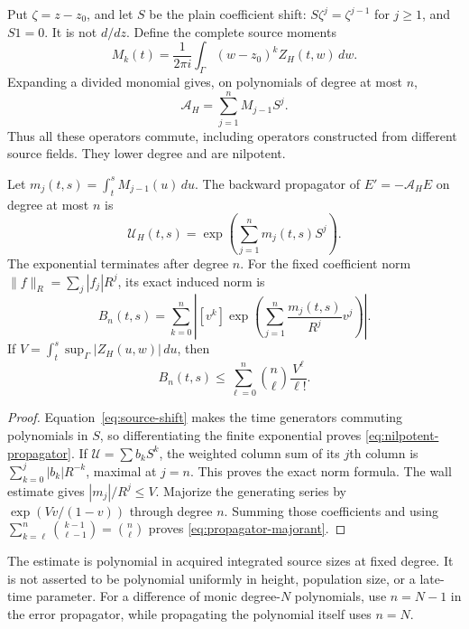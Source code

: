 Put $\zeta=z-z_0$, and let $S$ be the plain coefficient shift:
$S\zeta^j=\zeta^{j-1}$ for $j\ge1$, and $S1=0$. It is not
$d/dz$. Define the complete source moments
\[
 M_k(t)=\frac1{2\pi i}\int_\Gamma(w-z_0)^k Z_H(t,w)\,dw.
\]
Expanding a divided monomial gives, on polynomials of degree at most $n$,
\begin{equation}\label{eq:source-shift}
 \mathcal A_H=\sum_{j=1}^{n}M_{j-1}S^j.
\end{equation}
Thus all these operators commute, including operators constructed from
different source fields. They lower degree and are nilpotent.

\begin{theorem}\label{thm:nilpotent-propagator}
Let $m_j(t,s)=\int_t^sM_{j-1}(u)\,du$. The backward propagator of
$E'=-\mathcal A_HE$ on degree at most $n$ is
\begin{equation}\label{eq:nilpotent-propagator}
 \mathcal U_H(t,s)=\exp\!\left(\sum_{j=1}^n m_j(t,s)S^j\right).
\end{equation}
The exponential terminates after degree $n$. For the fixed coefficient norm
$\|f\|_R=\sum_j|f_j|R^j$, its exact induced norm is
\begin{equation}\label{eq:propagator-norm}
 B_n(t,s)=\sum_{k=0}^n
 \left|[v^k]\exp\!\left(\sum_{j=1}^n\frac{m_j(t,s)}{R^j}v^j\right)\right|.
\end{equation}
If $V=\int_t^s\sup_\Gamma|Z_H(u,w)|\,du$, then
\begin{equation}\label{eq:propagator-majorant}
 B_n(t,s)\le\sum_{\ell=0}^n\binom n\ell\frac{V^\ell}{\ell!}.
\end{equation}
\end{theorem}

\begin{proof}
Equation~\eqref{eq:source-shift} makes the time generators commuting
polynomials in $S$, so differentiating the finite exponential proves
\eqref{eq:nilpotent-propagator}. If $\mathcal U=\sum b_kS^k$, the weighted
column sum of its $j$th column is $\sum_{k=0}^j|b_k|R^{-k}$, maximal at
$j=n$. This proves the exact norm formula. The wall estimate gives
$|m_j|/R^j\le V$. Majorize the generating series by
$\exp(Vv/(1-v))$ through degree $n$. Summing those coefficients and using
$\sum_{k=\ell}^n\binom{k-1}{\ell-1}=\binom n\ell$ proves
\eqref{eq:propagator-majorant}.
\end{proof}

The estimate is polynomial in acquired integrated source sizes at fixed
degree. It is not asserted to be polynomial uniformly in height, population
size, or a late-time parameter. For a difference of monic degree-$N$
polynomials, use $n=N-1$ in the error propagator, while propagating the
polynomial itself uses $n=N$.

